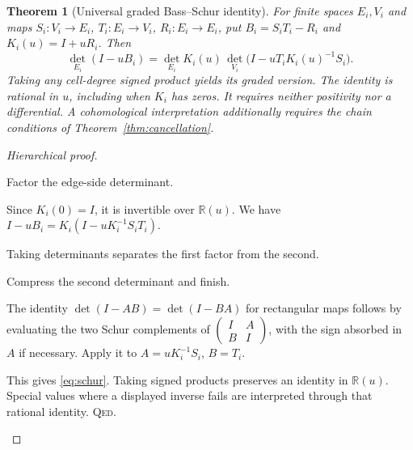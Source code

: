 \documentclass[11pt,a4paper]{article}
\newtheorem{theorem}[definition]{Theorem}
\theoremstyle{remark}\newtheorem{remark}[definition]{Remark}
\newcommand{\R}{\mathbb R}\newcommand{\C}{\mathbb C}\newcommand{\Z}{\mathbb Z}
\newcommand{\QED}{\textsc{Qed}}
\begin{document}
\begin{theorem}[Universal graded Bass--Schur identity]\label{thm:schur}
For finite spaces $E_i,V_i$ and maps $S_i:V_i\to E_i$, $T_i:E_i\to V_i$, $R_i:E_i\to E_i$, put $B_i=S_iT_i-R_i$ and $K_i(u)=I+uR_i$. Then
\[
\det_{E_i}(I-uB_i)=\det_{E_i}K_i(u)\,
\det_{V_i}\bigl(I-uT_iK_i(u)^{-1}S_i\bigr).
\tag{4.1}\label{eq:schur}
\]
Taking any cell-degree signed product yields its graded version. The identity is rational in $u$, including when $K_i$ has zeros. It requires neither positivity nor a differential. A cohomological interpretation additionally requires the chain conditions of Theorem~\ref{thm:cancellation}.
\end{theorem}
\begin{proof}[Hierarchical proof]
\begin{steps}
\item Factor the edge-side determinant.
\begin{steps}
\item Since $K_i(0)=I$, it is invertible over $\R(u)$. We have $I-uB_i=K_i(I-uK_i^{-1}S_iT_i)$.
\item Taking determinants separates the first factor from the second.
\end{steps}
\item Compress the second determinant and finish.
\begin{steps}
\item The identity $\det(I-AB)=\det(I-BA)$ for rectangular maps follows by evaluating the two Schur complements of $\left(\begin{smallmatrix}I&A\\B&I\end{smallmatrix}\right)$, with the sign absorbed in $A$ if necessary. Apply it to $A=uK_i^{-1}S_i$, $B=T_i$.
\item This gives \eqref{eq:schur}. Taking signed products preserves an identity in $\R(u)$. Special values where a displayed inverse fails are interpreted through that rational identity. \QED.
\end{steps}
\end{steps}
\end{proof}
\end{document}

